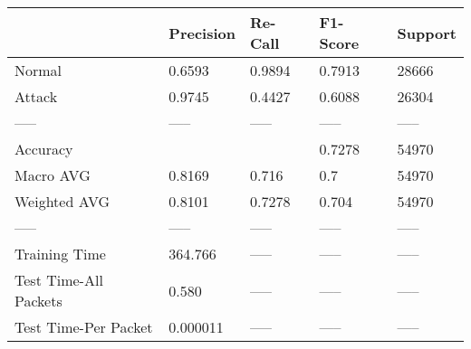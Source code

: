 \begin{tabular}{lllll}
\toprule
{} & Precision & Re-Call & F1-Score & Support \\
\midrule
Normal                &    0.6593 &  0.9894 &   0.7913 &   28666 \\
Attack                &    0.9745 &  0.4427 &   0.6088 &   26304 \\
-----                 &     ----- &   ----- &    ----- &   ----- \\
Accuracy              &           &         &   0.7278 &   54970 \\
Macro AVG             &    0.8169 &   0.716 &      0.7 &   54970 \\
Weighted AVG          &    0.8101 &  0.7278 &    0.704 &   54970 \\
-----                 &     ----- &   ----- &    ----- &   ----- \\
Training Time         &   364.766 &   ----- &    ----- &   ----- \\
Test Time-All Packets &     0.580 &   ----- &    ----- &   ----- \\
Test Time-Per Packet  &  0.000011 &   ----- &    ----- &   ----- \\
\bottomrule
\end{tabular}
